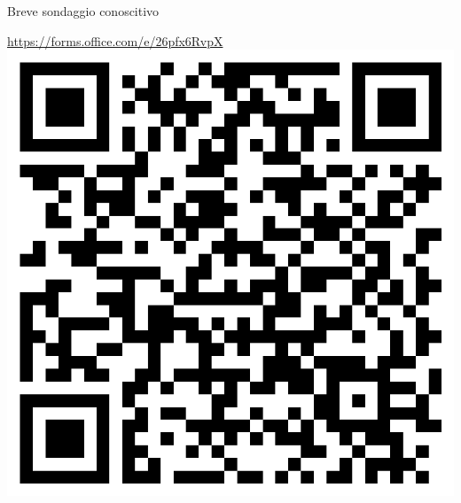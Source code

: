 \begin{frame}{Breve sondaggio conoscitivo}
  \begin{center}
    \vfill
    \url{https://forms.office.com/e/26pfx6RvpX}
    \vfill
    \includegraphics[height=.6\textheight]{images/sondaggio-qr.png}
    \vfill
  \end{center}
\end{frame}

